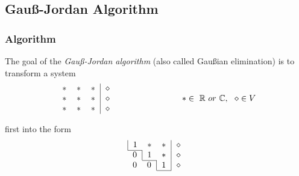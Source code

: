 \documentclass{beamer}
\renewcommand{\emph}[1]{{\color{Turquoise3}\textsl{#1}}}
\newcommand{\C}{\mathbb{C}} \newcommand{\F}{\mathbb{F}} \newcommand{\R}{\mathbb{R}} \newcommand{\Q}{\mathbb{Q}}
\begin{document}
\subsection{Gau\ss-Jordan Algorithm}
\begin{frame}
    \frametitle{Algorithm}
    The goal of the \emph{Gau\ss-Jordan algorithm} (also called Gau\ss ian elimination) is to transform a system
    \begin{equation*}
        \begin{tabular}{ccc|c}
            $\ast$ & $\ast$ & $\ast$ & $\diamond$ \\
            $\ast$ & $\ast$ & $\ast$ & $\diamond$ \\
            $\ast$ & $\ast$ & $\ast$ & $\diamond$ \\
        \end{tabular}
        \qquad\qquad\qquad\qquad
        \ast\in~\R~or~\C,~~\diamond\in V
    \end{equation*}

    first into the form \\
    \begin{equation}
        \begin{array}{c}
            \begin{tabular}{|ccc|c}
                1 & $\ast$ & $\ast$ & $\diamond$ \\ \cline{1-1}
            \end{tabular} \\
            \begin{tabular}{c|cc|c}
                0 & $1$ & $\ast$ & $\diamond$ \\ \cline{2-2}
            \end{tabular} \\
            \begin{tabular}{cc|c|c}
                0 & $0$ & $1$ & $\diamond$ \\
                \cline{3-3}
            \end{tabular}
        \end{array}
    \end{equation}


\end{frame}
\end{document}
